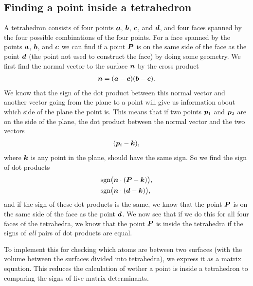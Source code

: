 \subsection{Finding a point inside a tetrahedron}
A tetrahedron consists of four points $\boldsymbol{a}$, $\boldsymbol{b}$, $\boldsymbol{c}$, and $\boldsymbol{d}$, and four faces spanned by the four possible combinations of the four points. For a face spanned by the points $\boldsymbol{a}$, $\boldsymbol{b}$, and $\boldsymbol{c}$ we can find if a point $\boldsymbol{P}$ is on the same side of the face as the point $\boldsymbol{d}$ (the point not used to construct the face) by doing some geometry. We first find the normal vector to the surface $\boldsymbol{n}$ by the cross product 
\begin{align*}
    \boldsymbol{n} = (\boldsymbol{a}-\boldsymbol{c})(\boldsymbol{b}-\boldsymbol{c}).
\end{align*}
We know that the sign of the dot product between this normal vector and another vector going from the plane to a point will give us information about which side of the plane the point is. This means that if two points $\boldsymbol{p}_1$ and $\boldsymbol{p}_2$ are on the side of the plane, the dot product between the normal vector and the two vectors
\begin{align*}
    (\boldsymbol{p}_i - \boldsymbol{k}),
\end{align*}
where $\boldsymbol{k}$ is any point in the plane, should have the same sign. So we find the sign of dot products
\begin{align*}
    &\text{sgn}\big(\boldsymbol{n}\cdot(\boldsymbol{P} - \boldsymbol{k})\big), \\
    &\text{sgn}\big(\boldsymbol{n}\cdot(\boldsymbol{d} - \boldsymbol{k})\big),
\end{align*}
and if the sign of these dot products is the same, we know that the point $\boldsymbol{P}$ is on the same side of the face as the point $\boldsymbol{d}$. We now see that if we do this for all four faces of the tetrahedra, we know that the point $\boldsymbol{P}$ is inside the tetrahedra if the signs of \emph{all} pairs of dot products are equal.

To implement this for checking which atoms are between two surfaces (with the volume between the surfaces divided into tetrahedra), we express it as a matrix equation. This reduces the calculation of wether a point is inside a tetrahedron to comparing the signs of five matrix determinants.


